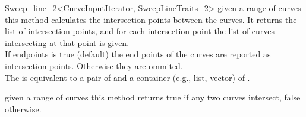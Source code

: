 \begin{ccRefClass}{Sweep_line_2<CurveInputIterator, SweepLineTraits_2>}
{given a range of curves this method calculates the intersection points
between the curves. It returns the list of intersection points,
and for each intersection point the list of curves intersecting
at that point is given. 
\\If endpoints is true (default) the end points
of the curves are reported as intersection points. Otherwise they are 
ommited.
\\The {} is equivalent to a pair of 
 and a container (e.g., list, vector) of .}
 

{given a range of curves this method returns true if any two curves intersect,
false otherwise.}

\end{ccRefClass}

\ccRefPageEnd
